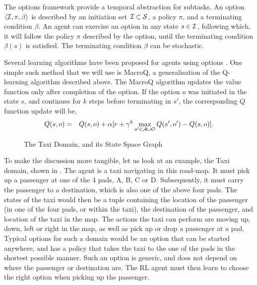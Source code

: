 The options framework provide a temporal abstraction for subtasks. An
option $\langle  \mathcal{I},\pi,\beta \rangle$ is described by an initiation set $\mathcal{I} \subset
\mathcal{S}$, a policy $\pi$, and a terminating condition $\beta$.  An agent
can exercise an option in any state $s \in \mathcal{I}$, following which,
it will follow the policy $\pi$ described by the option, until the
terminating condition $\beta(s)$ is satisfied. The terminating condition
$\beta$ can be stochastic.

Several learning algorithms have been proposed for agents using options
\cite{SuttonPrecupSingh1998,BartoMahadevan}. One simple such method that
we will use is MacroQ, a generalisation of the Q-learning algorithm
described above. The MacroQ algorithm updates the value function only
after completion of the option. If the option $o$ was initiated in the
state $s$, and continues for $k$ steps before terminating in $s'$, the
corresponding $Q$ function update will be,
\begin{eqnarray*}
    Q(s,o) &=& Q(s,o) + \alpha [ r + \gamma^{k} \max_{o' \in \mathcal{A} \cup \mathcal{O}} Q(s',o') - Q(s,o) ].
\end{eqnarray*}

\begin{figure}[th]
    \center
    \subfigure{
      
      \label{fig:taxi-domain}
    }
    \caption{The Taxi Domain, and its State Space Graph}
\end{figure}

\begin{example}
To make the discussion more tangible, let us look at an example, the
Taxi domain, shown in . The agent is a taxi
navigating in this road-map. It must pick up a passenger at one of the
4 pads, A, B, C or D.  Subsequently, it must carry the passenger to a
destination, which is also one of the above four pads. The states of
the taxi would then be a tuple containing the location of the
passenger (in one of the four pads, or within the taxi), the
destination of the passenger, and location of the taxi in the map.
The actions the taxi can perform are moving up, down, left or right in
the map, as well as pick up or drop a passenger at a pad. 
Typical options for such a domain would be an option that can be
started anywhere, and has a policy that takes the taxi to the one of
the pads in the shortest possible manner. Such an option is generic,
and does not depend on where the passenger or destination are. The RL
agent must then learn to choose the right option when picking up the
passenger.
\end{example}


